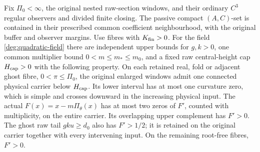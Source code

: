 \begin{corollary}
\label{deg:cor-positive-quadratic-whole-carrier}
Fix \(\Pi_0<\infty\), the original nested raw-section windows,
and their ordinary \(C^3\) regular observers and divided finite
closing. The passive compact \((A,C)\)-set is contained in their
prescribed common coefficient neighbourhood, with the original
buffer and observer margins. Use fibres with \(K_{\rm fin}>0\).
For the field \eqref{deg:quadratic-field} there are independent
upper bounds for \(g,k>0\), one common multiplier bound
\(0<m\le m_*\le m_0\), and a fixed raw central-height cap
\(H_{\rm cap}>0\) with the following property.
On each retained real, fold or adjacent ghost fibre,
\(0<\pi\le\Pi_0\), the original enlarged windows admit one
connected physical carrier below \(H_{\rm cap}\). Its lower
interval has at most one curvature zero, which is simple and
crosses downward in the increasing physical input. The actual
\(F(x)=x-m\Pi_\theta(x)\) has at most two zeros of \(F'\), counted
with multiplicity, on the entire carrier. Its overlapping upper
complement has \(F'>0\). The ghost raw tail \(gku\ge d_0\) also
has \(F'>1/2\); it is retained on the original carrier together
with every intervening input. On the remaining root-free fibres,
\(F'>0\).
\end{corollary}

